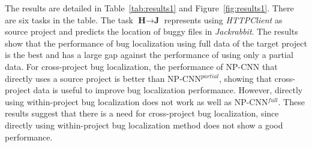 The results are detailed in Table~\ref{tab:results1} and Figure~\ref{fig:results1}. There are six tasks in the table.%
The task $\textbf{H} \rightarrow \textbf{J}$ represents using \textit{HTTPClient} as source project and predicts the location of buggy files in \textit{Jackrabbit}. The results show that the performance of bug localization using full data of the target project is the best and has a large gap against the performance of using only a partial data. For cross-project bug localization, the performance of NP-CNN that directly uses a source project is better than NP-CNN$^{partial}$, showing that cross-project data is useful to improve bug localization performance. However, directly using within-project bug localization does not work as well as NP-CNN$^{full}$. These results suggest that there is a need for cross-project bug localization, since directly using within-project bug localization method does not show a good performance.


